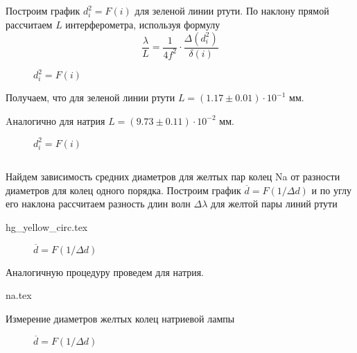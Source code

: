 \subsection{}
Построим график $d^2_i = F(i)$ для зеленой линии ртути. По наклону прямой
рассчитаем $L$ интерферометра, используя формулу
$$
\frac{\lambda}{L} = \frac{1}{4f^2} \cdot \frac{\Delta (d^2_i)}{\delta (i)}
$$

\begin{figure}[h!]
  \caption{$d^2_i = F(i)$}
  \label{img::avg_diam_hg}
\end{figure}

Получаем, что для зеленой линии ртути $L = (1.17 \pm 0.01) \cdot 10^{-1}$ мм.

Aналогично для натрия $L = (9.73 \pm 0.11) \cdot 10^{-2}$ мм.

\begin{figure}[h!]
  \caption{$d^2_i = F(i)$}
  \label{img::avg_diam_na}
\end{figure}

\subsection{}

Найдем зависимость средних диаметров для желтых пар колец Na от разности диаметров
для колец одного порядка. Построим график $\overline{d} = F(1/\Delta d)$ и по
углу его наклона рассчитаем разность длин волн $\Delta \lambda$ для желтой пары
линий ртути

{hg_yellow_circ.tex}

\begin{figure}[h!]
  \caption{$\overline{d} = F(1/\Delta d)$}
  \label{img::avg_diam_hg}
\end{figure}

Аналогичную процедуру проведем для натрия.

\begin{table}[h!]
  \begin{center}
    {na.tex}
  \end{center}
  \caption{Измерение диаметров желтых колец натриевой лампы}
\end{table}

\begin{figure}[h!]
  \caption{$\overline{d} = F(1/\Delta d)$}
  \label{img::avg_diam_na}
\end{figure}



